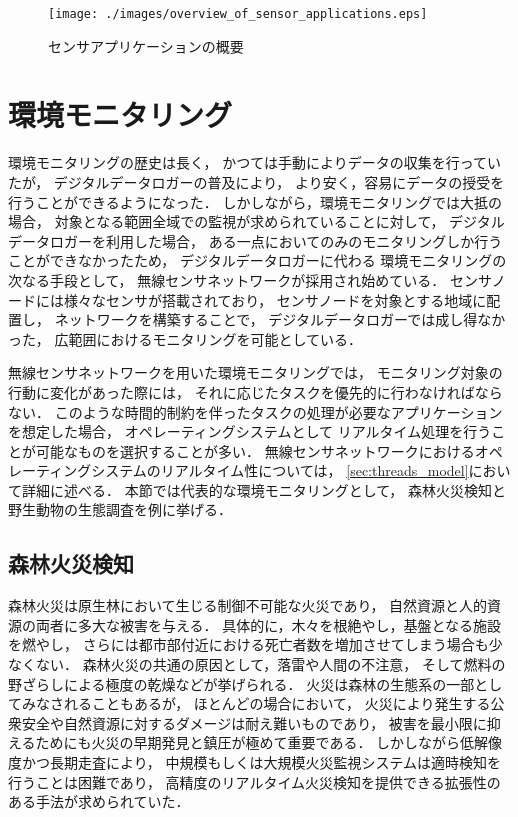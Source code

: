\begin{figure}[htbp]
 \begin{center}
  \texttt{[image: ./images/overview\_of\_sensor\_applications.eps]}
 \end{center}
 \caption{センサアプリケーションの概要}
 \label{fig:overview_of_sensor_applications}
\end{figure}




\section{環境モニタリング}\label{sec:environmental_monitoring}
環境モニタリングの歴史は長く，
かつては手動によりデータの収集を行っていたが，
デジタルデータロガーの普及により，
より安く，容易にデータの授受を行うことができるようになった．
しかしながら，環境モニタリングでは大抵の場合，
対象となる範囲全域での監視が求められていることに対して，
デジタルデータロガーを利用した場合，
ある一点においてのみのモニタリングしか行うことができなかったため，
デジタルデータロガーに代わる
環境モニタリングの次なる手段として，
無線センサネットワークが採用され始めている．
センサノードには様々なセンサが搭載されており，
センサノードを対象とする地域に配置し，
ネットワークを構築することで，
デジタルデータロガーでは成し得なかった，
広範囲におけるモニタリングを可能としている．

無線センサネットワークを用いた環境モニタリングでは，
モニタリング対象の行動に変化があった際には，
それに応じたタスクを優先的に行わなければならない．
このような時間的制約を伴ったタスクの処理が必要なアプリケーションを想定した場合，
オペレーティングシステムとして
リアルタイム処理を行うことが可能なものを選択することが多い．
無線センサネットワークにおけるオペレーティングシステムのリアルタイム性については，
\ref{sec:threads_model}において詳細に述べる．
本節では代表的な環境モニタリングとして，
森林火災検知と野生動物の生態調査を例に挙げる．




\subsection{森林火災検知}
森林火災は原生林において生じる制御不可能な火災であり，
自然資源と人的資源の両者に多大な被害を与える．
具体的に，木々を根絶やし，基盤となる施設を燃やし，
さらには都市部付近における死亡者数を増加させてしまう場合も少なくない．
森林火災の共通の原因として，落雷や人間の不注意，
そして燃料の野ざらしによる極度の乾燥などが挙げられる．
火災は森林の生態系の一部としてみなされることもあるが，
ほとんどの場合において，
火災により発生する公衆安全や自然資源に対するダメージは耐え難いものであり，
被害を最小限に抑えるためにも火災の早期発見と鎮圧が極めて重要である．
しかしながら低解像度かつ長期走査により，
中規模もしくは大規模火災監視システムは適時検知を行うことは困難であり，
高精度のリアルタイム火災検知を提供できる拡張性のある手法が求められていた．

